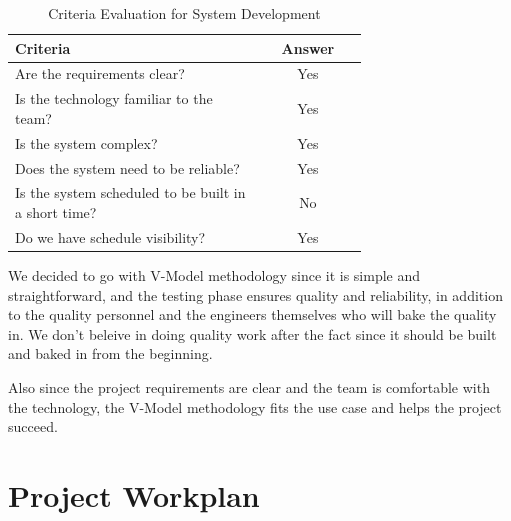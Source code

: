 \documentclass[a4paper]{report}
\begin{document}
\begin{table}[htbp]
    \centering
    \caption{Criteria Evaluation for System Development}
    \label{tab:methodology-criteria}
    \begin{tabular}{@{}p{0.7\linewidth}c@{}}
        \toprule
        Criteria & Answer \\
        \midrule
        Are the requirements clear? & Yes \\
        Is the technology familiar to the team? & Yes \\
        Is the system complex? & Yes \\
        Does the system need to be reliable? & Yes \\
        Is the system scheduled to be built in a short time? & No \\
        Do we have schedule visibility? & Yes \\
        \bottomrule
    \end{tabular}
\end{table}

We decided to go with V-Model methodology since it is simple and straightforward, and the testing phase ensures quality and reliability, in addition to the quality personnel and the engineers themselves who will bake the quality in. We don't beleive in doing quality work after the fact since it should be built and baked in from the beginning.

Also since the project requirements are clear and the team is comfortable with the technology, the V-Model methodology fits the use case and helps the project succeed.

\chapter{Project Workplan}
\end{document}
